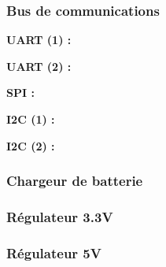 {{		
	}

	\clearpage
	\subsubsection{Bus de communications}
	{
		\textbf{UART (1) :}
		
		\textbf{UART (2) :}
		
		\textbf{SPI :}
		
		\textbf{I2C (1) :}
		
		\textbf{I2C (2) :}
	}

	\clearpage
	\subsubsection{Chargeur de batterie} \label{sssec:BatCharger}
	{
		
	}
	
	\subsubsection{Régulateur 3.3V} \label{sssec:Reg3V3}
	{
		
	}
	
	\subsubsection{Régulateur 5V} \label{sssec:Reg5V}
	{
		
	}
	

}


\clearpage